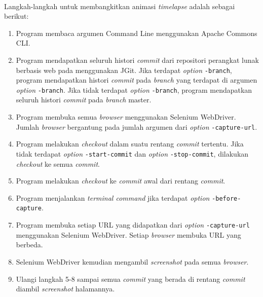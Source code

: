 \ \\

Langkah-langkah untuk membangkitkan animasi \textit{timelapse} adalah sebagai berikut:\\
\begin{enumerate}
\item Program membaca argumen Command Line menggunakan Apache Commons CLI.
\item Program mendapatkan seluruh histori \textit{commit} dari repositori perangkat lunak berbasis web pada  menggunakan JGit. Jika terdapat \textit{option} \texttt{-branch}, program mendapatkan histori \textit{commit} pada \textit{branch} yang terdapat di argumen \textit{option} \texttt{-branch}. Jika tidak terdapat \textit{option} \texttt{-branch}, program mendapatkan seluruh histori \textit{commit} pada \textit{branch} master. 
\item Program membuka semua \textit{browser} menggunakan Selenium WebDriver. Jumlah \textit{browser} bergantung pada jumlah argumen dari \textit{option} \texttt{-capture-url}.
\item Program melakukan \textit{checkout} dalam suatu rentang \textit{commit} tertentu. Jika tidak terdapat \textit{option} \texttt{-start-commit} dan \textit{option} \texttt{-stop-commit}, dilakukan \textit{checkout} ke semua \textit{commit}.
\item Program melakukan \textit{checkout} ke \textit{commit} awal dari rentang \textit{commit}. 
\item Program menjalankan \textit{terminal command} jika terdapat \textit{option} \texttt{-before-capture}.
\item Program membuka setiap URL yang didapatkan dari \textit{option} \texttt{-capture-url} menggunakan Selenium WebDriver. Setiap \textit{browser} membuka URL yang berbeda.
\item Selenium WebDriver kemudian mengambil \textit{screenshot} pada semua \textit{browser}.
\item Ulangi langkah 5-8 sampai semua \textit{commit} yang berada di rentang \textit{commit} diambil \textit{screenshot} halamannya.

\end{enumerate}
